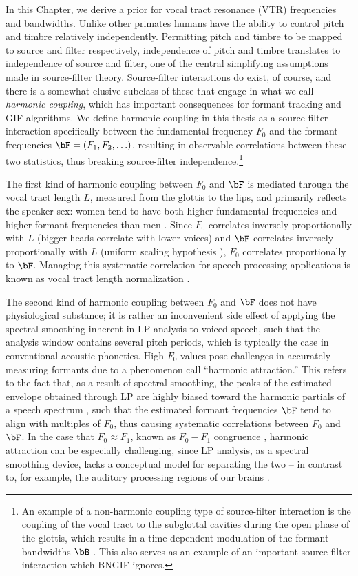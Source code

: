 \begin{chaptersections}{%
In this Chapter, we derive a prior for vocal tract resonance (VTR) frequencies and bandwidths.
}
Unlike other primates humans have the ability to control pitch and timbre relatively independently.
Permitting pitch and timbre to be mapped to source and filter respectively, independence of pitch and timbre translates to independence of source and filter, one of the central simplifying assumptions made in source-filter theory.
Source-filter interactions do exist, of course, and there is a somewhat elusive subclass of these that engage in what we call \emph{harmonic coupling}, which has important consequences for formant tracking and GIF algorithms.
We define harmonic coupling in this thesis as a source-filter interaction specifically between the fundamental frequency $F_0$ and the formant frequencies $\bF = (F_1, F_2, \ldots)$, resulting in observable correlations between these two statistics, thus breaking source-filter independence.\footnote{%
	An example of a non-harmonic coupling type of source-filter interaction is the coupling of the vocal tract to the subglottal cavities during the open phase of the glottis, which results in a time-dependent modulation of the formant bandwidths $\bB$ \citep{Pinson1963}.
	This also serves as an example of an important source-filter interaction which BNGIF ignores.
}

The first kind of harmonic coupling between $F_0$ and $\bF$ is mediated through the vocal tract length $L$, measured from the glottis to the lips, and primarily reflects the speaker sex: women tend to have both higher fundamental frequencies and higher formant frequencies than men \citep{Goldstein1980,Fant1966}.
Since $F_0$ correlates inversely proportionally with $L$ (bigger heads correlate with lower voices) and $\bF$ correlates inversely proportionally with $L$ (uniform scaling hypothesis \citep{Fant1966}), $F_0$ correlates proportionally to $\bF$.
Managing this systematic correlation for speech processing applications is known as vocal tract length normalization \citep{Cohen1995}.

The second kind of harmonic coupling between $F_0$ and $\bF$ does not have physiological substance; it is rather an inconvenient side effect of applying the spectral smoothing inherent in LP analysis to voiced speech, such that the analysis window contains several pitch periods, which is typically the case in conventional acoustic phonetics.
High $F_0$ values pose challenges in accurately measuring formants %
due to a phenomenon \cite{Whalen2022} call ``harmonic attraction.''
This refers to the fact that, as a result of spectral smoothing, the peaks of the estimated envelope obtained through LP are highly biased toward the harmonic partials of a speech spectrum \citep{Yoshii2013}, such that the estimated formant frequencies $\bF$ tend to align with multiples of $F_0$, thus causing systematic correlations between $F_0$ and $\bF$.
In the case that $F_0 \approx F_1$, known as $F_0-F_1$ congruence \citep{Kent2018}, harmonic attraction can be especially challenging, since LP analysis, as a spectral smoothing device, lacks a conceptual model for separating the two -- in contrast to, for example, the auditory processing regions of our brains \citep{Schnupp2011}.


\end{chaptersections}
